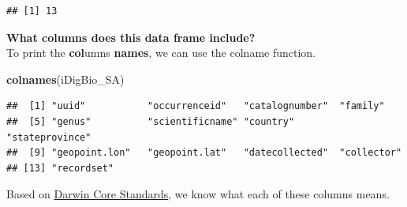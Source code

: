 \documentclass[
]{book}
\newenvironment{Shaded}{\begin{snugshade}}{\end{snugshade}}
\newcommand{\KeywordTok}[1]{\textcolor[rgb]{0.13,0.29,0.53}{\textbf{#1}}}
\newcommand{\NormalTok}[1]{#1}
\begin{document}
\begin{verbatim}
## [1] 13
\end{verbatim}

\textbf{What columns does this data frame include?}\\
To print the \textbf{col}umns \textbf{names}, we can use the colname function.

\begin{Shaded}
\begin{Highlighting}[]
\KeywordTok{colnames}\NormalTok{(iDigBio\_SA)}
\end{Highlighting}
\end{Shaded}

\begin{verbatim}
##  [1] "uuid"           "occurrenceid"   "catalognumber"  "family"        
##  [5] "genus"          "scientificname" "country"        "stateprovince" 
##  [9] "geopoint.lon"   "geopoint.lat"   "datecollected"  "collector"     
## [13] "recordset"
\end{verbatim}

Based on \href{https://dwc.tdwg.org/}{Darwin Core Standards}, we know what each of these columns means.
\end{document}
